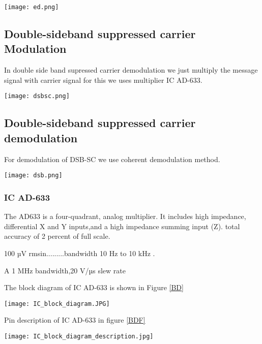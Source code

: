 \documentclass{article}
\begin{document}
\begin{figure*}[ht]
	\centering
	\texttt{[image: ed.png]}
	\caption{Envelope detector}
	\label{ed}
\end{figure*}

\subsection{Double-sideband suppressed carrier Modulation}
In double side band supressed carrier demodulation we just multiply the message signal with carrier signal for this we uses multiplier IC AD-633.
\begin{figure*}[ht]
	\centering
	\texttt{[image: dsbsc.png]}
	\caption{DSB-SC Modulation}
	\label{dsbsc}
\end{figure*}

\subsection{Double-sideband suppressed carrier demodulation}
For demodulation of DSB-SC we use coherent demodulation method.

\begin{figure*}[ht]
	\centering
	\texttt{[image: dsb.png]}
	\caption{DSB-SC Demodulation}
	\label{dsbsc}
\end{figure*}




\subsubsection{IC AD-633}
The AD633 is a four-quadrant, analog multiplier. It includes high impedance, differential X and Y inputs,and a high impedance summing input (Z). 
total accuracy of 2 percent of full scale.\par 100 µV rmsin.........bandwidth 10 Hz to 10 kHz . \par A 1 MHz bandwidth,20 V/µs slew rate \par
The block diagram of IC AD-633 is shown in Figure \ref{BD} 
\begin{figure*}[ht]
	\centering
	\texttt{[image: IC\_block\_diagram.JPG]}
	\caption{Block diagram of IC AD-633}
	\label{BD}
\end{figure*}


Pin description of IC AD-633 in figure \ref{BDF} 
\begin{figure*}[ht]
	\centering
	\texttt{[image: IC\_block\_diagram\_description.jpg]}
	\caption{Description of different pin of IC AD-633}
	\label{BDF}
\end{figure*}
 
\end{document}
